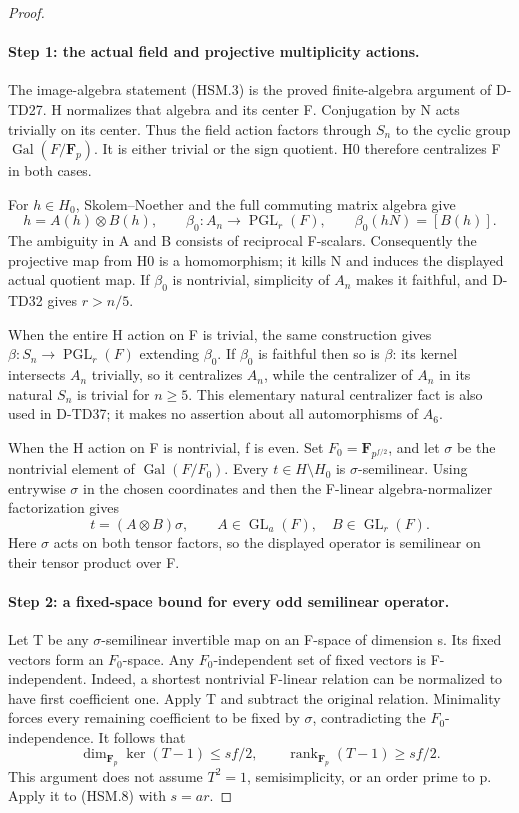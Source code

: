 \begin{proof}
\paragraph{Step 1: the actual field and projective multiplicity actions.}
The image-algebra statement (HSM.3) is the proved finite-algebra
argument of D-TD27.  H normalizes that algebra and its center F.
Conjugation by N acts trivially on its center.  Thus the field
action factors through \(S_n\) to the cyclic group
\(\operatorname{Gal}(F/\mathbf F_p)\).  It is either trivial
or the sign quotient.  H0 therefore centralizes F in both cases.

For \(h\in H_0\), Skolem--Noether and the full commuting
matrix algebra give
\[
 h=A(h)\otimes B(h),\qquad
 \beta_0:A_n\longrightarrow\operatorname{PGL}_r(F),
 \qquad \beta_0(hN)=[B(h)].
 \tag{HSM.7}
\]
The ambiguity in A and B consists of reciprocal F-scalars.
Consequently the projective map from H0 is a homomorphism;
it kills N and induces the displayed actual quotient map.
If \(\beta_0\) is nontrivial, simplicity of \(A_n\)
makes it faithful, and D-TD32 gives \(r>n/5\).

When the entire H action on F is trivial, the same construction
gives \(\beta:S_n\to\operatorname{PGL}_r(F)\) extending
\(\beta_0\).  If \(\beta_0\) is faithful then so is
\(\beta\): its kernel intersects \(A_n\) trivially, so
it centralizes \(A_n\), while the centralizer of \(A_n\)
in its natural \(S_n\) is trivial for \(n\ge5\).
This elementary natural centralizer fact is also used in D-TD37;
it makes no assertion about all automorphisms of \(A_6\).

When the H action on F is nontrivial, f is even.  Set
\(F_0=\mathbf F_{p^{f/2}}\), and let \(\sigma\) be
the nontrivial element of \(\operatorname{Gal}(F/F_0)\).
Every \(t\in H\setminus H_0\) is \(\sigma\)-semilinear.
Using entrywise \(\sigma\) in the chosen coordinates and
then the F-linear algebra-normalizer factorization gives
\[
 t=(A\otimes B)\sigma,
 \qquad A\in\operatorname{GL}_a(F),\quad
 B\in\operatorname{GL}_r(F).
 \tag{HSM.8}
\]
Here \(\sigma\) acts on both tensor factors, so the displayed
operator is semilinear on their tensor product over F.

\paragraph{Step 2: a fixed-space bound for every odd semilinear operator.}
Let T be any \(\sigma\)-semilinear invertible map on an
F-space of dimension s.  Its fixed vectors form an \(F_0\)-space.
Any \(F_0\)-independent set of fixed vectors is F-independent.
Indeed, a shortest nontrivial F-linear relation can be normalized
to have first coefficient one.  Apply T and subtract the original
relation.  Minimality forces every remaining coefficient to be
fixed by \(\sigma\), contradicting the \(F_0\)-independence.
It follows that
\[
 \dim_{\mathbf F_p}\ker(T-1)\le sf/2,
 \qquad \operatorname{rank}_{\mathbf F_p}(T-1)\ge sf/2.
 \tag{HSM.9}
\]
This argument does not assume \(T^2=1\), semisimplicity,
or an order prime to p.  Apply it to (HSM.8) with \(s=ar\).


\end{proof}
